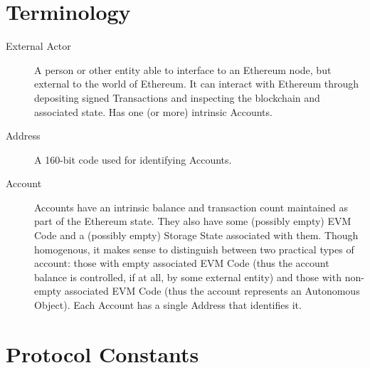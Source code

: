 \documentclass[9pt,oneside]{amsart}
\begin{document}
\appendix

\section{Terminology} \label{ch:Terminology}

\begin{description}
\item[External Actor] A person or other entity able to interface to an Ethereum node, but external to the world of Ethereum. It can interact with Ethereum through depositing signed Transactions and inspecting the blockchain and associated state. Has one (or more) intrinsic Accounts.

\item[Address] A 160-bit code used for identifying Accounts.

\item[Account] Accounts have an intrinsic balance and transaction count maintained as part of the Ethereum state. They also have some (possibly empty) EVM Code and a (possibly empty) Storage State associated with them. Though homogenous, it makes sense to distinguish between two practical types of account: those with empty associated EVM Code (thus the account balance is controlled, if at all, by some external entity) and those with non-empty associated EVM Code (thus the account represents an Autonomous Object). Each Account has a single Address that identifies it.

\end{description}

\section{Protocol Constants}\label{sec:constants}
\end{document}
